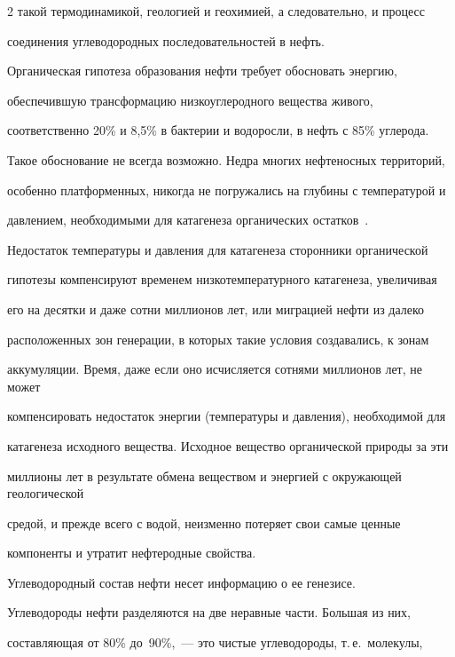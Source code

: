 \begin{multicols}{2}
такой термодинамикой, геологией и геохимией, а следовательно, и процесс 

соединения углеводородных последовательностей в нефть.

{



}

     

     Органическая гипотеза образования нефти требует обосновать энергию, 

обеспечившую трансформацию низкоуглеродного вещества живого, 

соответственно 20\% и 8,5\% в бактерии и водоросли, в нефть с 85\% углерода. 

Такое обоснование не всегда возможно. Недра многих нефтеносных территорий, 

особенно платформенных, никогда не погружались на глубины с температурой и 

давлением, необходимыми для катагенеза органических остатков~\cite{19s}. 

Недостаток температуры и давления для катагенеза сторонники органической 

гипотезы компенсируют временем низкотемпературного катагенеза, увеличивая 

его на десятки и даже сотни миллионов лет, или миграцией нефти из далеко 

расположенных зон генерации, в которых такие условия создавались, к зонам 

аккумуляции. Время, даже если оно ис\-чис\-ля\-ет\-ся сотнями миллионов лет, не может 

компенсировать недостаток энергии (температуры и давления), необходимой для 

катагенеза исходного вещества. Исходное вещество органической природы за эти 

миллионы лет в результате обмена веществом и энергией с окружающей геологической 

средой, и прежде всего с водой, неизменно потеряет свои самые ценные 

компоненты и утратит нефтеродные свойства. 

     

     Углеводородный состав нефти несет информацию о ее генезисе. 

Углеводороды нефти разделяются на две неравные части. Большая из них, 

составляющая от 80\% до~90\%,~--- это чистые углеводороды, т.\,е.\ молекулы, 


\end{multicols}
